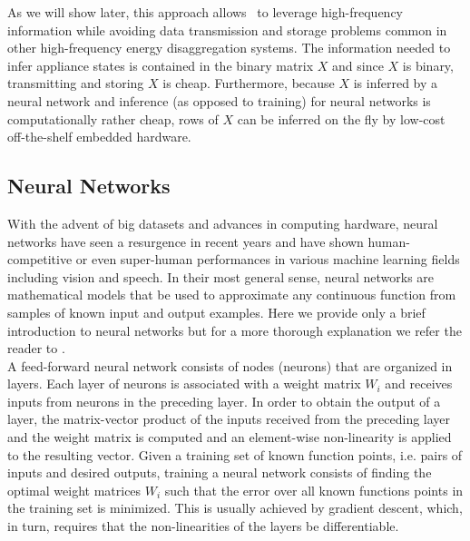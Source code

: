  As we will show later, this approach allows \ourname~to leverage high-frequency information while avoiding data transmission and storage problems common in other high-frequency energy disaggregation systems. The information needed to infer appliance states is contained in the binary matrix $X$ and since $X$ is binary, transmitting and storing $X$ is cheap. Furthermore, because $X$ is inferred by a neural network and inference (as opposed to training) for neural networks is computationally rather cheap, rows of $X$ can be inferred on the fly by low-cost off-the-shelf embedded hardware.
 
\subsection{Neural Networks}
With the advent of big datasets and advances in computing hardware, neural networks have seen a resurgence in recent years and have shown human-competitive or even super-human performances in various machine learning fields including vision and speech. In their most general sense, neural networks are mathematical models that be used to approximate any continuous function from samples of known input and output examples. Here we provide only a brief introduction to neural networks but for a more thorough explanation we refer the reader to \cite{schmidhuber2015deep}. \\
 A feed-forward neural network consists of nodes (neurons) that are organized in layers. Each layer of neurons is associated with a weight matrix $W_i$ and receives inputs from neurons in the preceding layer. In order to obtain the output of a layer, the matrix-vector product of the inputs received from the preceding layer and the weight matrix is computed and an element-wise non-linearity is applied to the resulting vector. Given a training set of known function points, i.e. pairs of inputs and desired outputs, training a neural network consists of finding the optimal weight matrices $W_i$ such that the error over all known functions points in the training set is minimized. This is usually achieved by gradient descent, which, in turn, requires that the non-linearities of the layers be differentiable.\\
